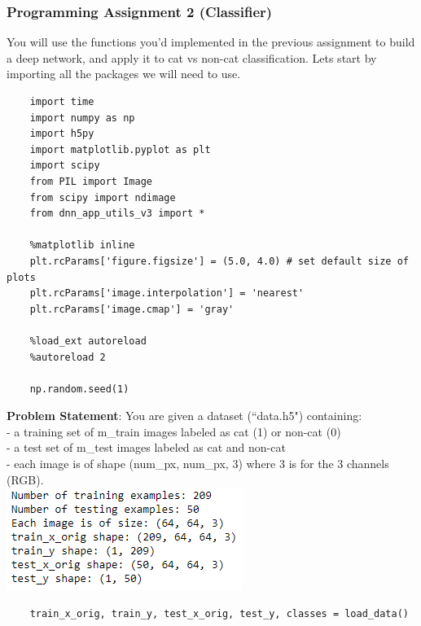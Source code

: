 \documentclass[11pt, a4paper]{article}
\begin{document}
\begin{spacing}{1.1}
	\subsubsection{Programming Assignment 2 (Classifier)}
	You will use the functions you'd implemented in the previous assignment to build a deep network, and apply it to cat vs non-cat classification. Lets start by importing all the packages we will need to use. 
	\begin{lstlisting}
	import time
	import numpy as np
	import h5py
	import matplotlib.pyplot as plt
	import scipy
	from PIL import Image
	from scipy import ndimage
	from dnn_app_utils_v3 import *
	
	%matplotlib inline
	plt.rcParams['figure.figsize'] = (5.0, 4.0) # set default size of plots
	plt.rcParams['image.interpolation'] = 'nearest'
	plt.rcParams['image.cmap'] = 'gray'
	
	%load_ext autoreload
	%autoreload 2
	
	np.random.seed(1) \end{lstlisting} \newpage

	\noindent \textbf{Problem Statement}: You are given a dataset (``data.h5") containing: \\
	\hspace*{3mm} - a training set of m\_train images labeled as cat (1) or non-cat (0) \\
	\hspace*{3mm} - a test set of m\_test images labeled as cat and non-cat \\
	\hspace*{3mm} - each image is of shape (num\_px, num\_px, 3) where 3 is for the 3 channels (RGB). \vspace*{2mm} \\
	\hspace*{50mm} \includegraphics[scale=.8]{cat_shape}
	\begin{lstlisting}
	train_x_orig, train_y, test_x_orig, test_y, classes = load_data()
	

\end{lstlisting}
\end{spacing}
\end{document}
